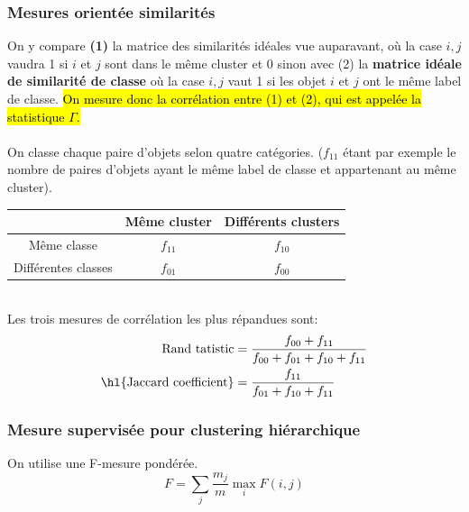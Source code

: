 \documentclass[letterpaper, 12pt]{article}
\newcommand{\alinea}{
\hspace*{0.5cm}}
\begin{document}
			\subsubsection{Mesures orientée similarités}
				\alinea On y compare \textbf{(1)} 
					la matrice des similarités idéales
					vue auparavant, où la case $i, j$ 
					vaudra 1 si $i$ et $j$ sont dans le
					même cluster et 0 sinon avec (2) la \textbf{matrice
					idéale de similarité de classe} où la case
					$i, j$ vaut 1 si les objet $i$ et $j$ ont
					le même label de classe. \hl{On mesure donc la 
					corrélation entre (1) et (2), qui est appelée 
					la statistique $\Gamma$.}\\
				~\\
				On classe chaque paire d'objets selon quatre catégories.
				($f_{11}$ étant par exemple le nombre de paires d'objets
				ayant le même label de classe et appartenant au même 
				cluster).\\
				\begin{center}
				\begin{tabular}{|c|c|c|}
				\hline
				                    & Même cluster & Différents clusters\\
				\hline
				Même classe         &    $f_{11}$  &       $f_{10}$     \\
				\hline				
				Différentes classes &    $f_{01}$  &       $f_{00}$     \\
				\hline
				\end{tabular}
				\end{center}~\\
				Les trois mesures de corrélation les plus répandues sont:
				\begin{align*}
					\text{Rand tatistic} &= \frac{f_{00} + f_{11}}%
						{f_{00} + f_{01} + f_{10} + f_{11}}\\
					\text{\hl{Jaccard coefficient}} &= \frac{f_{11}}{f_{01} + 
						f_{10} + f_{11}}
				\end{align*}
			\subsubsection{Mesure supervisée pour clustering hiérarchique}
				\alinea On utilise une F-mesure pondérée.
				$$ F = \sum_{j} \frac{m_j}{m} \max_{i} F(i, j) $$
\end{document}
